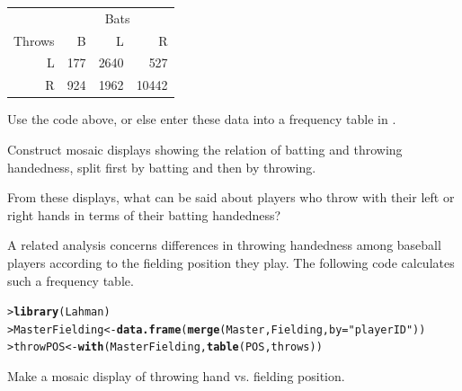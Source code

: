 \documentclass[10pt]{report}\usepackage[]{graphicx}\usepackage[]{color}
\makeatletter
\newcommand{\hlstr}[1]{\textcolor[rgb]{0.192,0.494,0.8}{#1}}%
\newcommand{\hlstd}[1]{\textcolor[rgb]{0.345,0.345,0.345}{#1}}%
\newcommand{\hlkwb}[1]{\textcolor[rgb]{0.69,0.353,0.396}{#1}}%
\newcommand{\hlkwc}[1]{\textcolor[rgb]{0.333,0.667,0.333}{#1}}%
\newcommand{\hlkwd}[1]{\textcolor[rgb]{0.737,0.353,0.396}{\textbf{#1}}}%
\newenvironment{kframe}{%
 \def\at@end@of@kframe{}%
 \ifinner\ifhmode%
  \def\at@end@of@kframe{\end{minipage}}%
  \begin{minipage}{\columnwidth}%
 \fi\fi%
 \def\FrameCommand##1{\hskip\@totalleftmargin \hskip-\fboxsep
 \colorbox{shadecolor}{##1}\hskip-\fboxsep
     \hskip-\linewidth \hskip-\@totalleftmargin \hskip\columnwidth}%
 \MakeFramed {\advance\hsize-\width
   \@totalleftmargin\z@ \linewidth\hsize
   \@setminipage}}%
 {\par\unskip\endMakeFramed%
 \at@end@of@kframe}
\newenvironment{knitrout}{}{} %
\renewenvironment{knitrout}{\small\renewcommand{\baselinestretch}{.85}}{} %
\makeatother
\begin{document}
\begin{Exercises}
\begin{table}[ht]
\centering
\begin{tabular}{r|rrr}
  \hline
       & \multicolumn{3}{c}{Bats} \\
Throws & B & L & R \\ 
  \hline
  L & 177 & 2640 & 527 \\ 
  R & 924 & 1962 & 10442 \\ 
   \hline
\end{tabular}
\end{table}
  \begin{itemize*}
    \item Use the code above, or else enter these data into a frequency table in \R.
    \begin{ans}
    \end{ans}
    
    \item Construct mosaic displays showing the relation of batting and throwing handedness, split first by batting and then by throwing.
    \begin{ans}
    \end{ans}
    
    \item From these displays, what can be said about players who throw with their left
    or right hands in terms of their batting handedness?
    \begin{ans}
    \end{ans}
    
  \end{itemize*}

\exercise\hard A related analysis concerns differences in throwing handedness among baseball players
according to the fielding position they play.  The following code calculates
such a frequency table.

\begin{knitrout}\footnotesize
{}\color{fgcolor}\begin{kframe}
\begin{alltt}
\hlstd{> }\hlkwd{library}\hlstd{(Lahman)}
\hlstd{> }\hlstd{MasterFielding} \hlkwb{<-} \hlkwd{data.frame}\hlstd{(}\hlkwd{merge}\hlstd{(Master, Fielding,} \hlkwc{by} \hlstd{=} \hlstr{"playerID"}\hlstd{))}
\hlstd{> }\hlstd{throwPOS} \hlkwb{<-} \hlkwd{with}\hlstd{(MasterFielding,} \hlkwd{table}\hlstd{(POS, throws))}
\end{alltt}
\end{kframe}
\end{knitrout}
  \begin{enumerate*}
    \item Make a mosaic display of throwing hand vs. fielding position.
    \begin{ans}
    \end{ans}
    

\end{enumerate*}
\end{Exercises}
\end{document}
